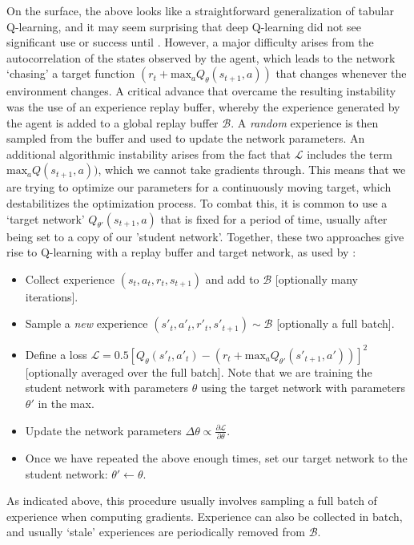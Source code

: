 On the surface, the above looks like a straightforward generalization of tabular Q-learning, and it may seem surprising that deep Q-learning did not see significant use or success until \citet{mnih2013playing}.
However, a major difficulty arises from the autocorrelation of the states observed by the agent, which leads to the network `chasing' a target function $(r_t + \text{max}_a Q_\theta(s_{t+1}, a))$ that changes whenever the environment changes.
A critical advance that overcame the resulting instability was the use of an experience replay buffer, whereby the experience generated by the agent is added to a global replay buffer $\mathcal{B}$.
A \emph{random} experience is then sampled from the buffer and used to update the network parameters.
An additional algorithmic instability arises from the fact that $\mathcal{L}$ includes the term $\text{max}_a Q(s_{t+1}, a))$, which we cannot take gradients through.
This means that we are trying to optimize our parameters for a continuously moving target, which destabilitizes the optimization process.
To combat this, it is common to use a `target network' $Q_{\theta'}(s_{t+1}, a)$ that is fixed for a period of time, usually after being set to a copy of our 'student network'.
Together, these two approaches give rise to Q-learning with a replay buffer and target network, as used by \citet{mnih2013playing}:
\begin{itemize}
    \item Collect experience $(s_t, a_t, r_t, s_{t+1})$ and add to $\mathcal{B}$ [optionally many iterations].
    \item Sample a \emph{new} experience $(s'_t, a'_t, r'_t, s'_{t+1}) \sim \mathcal{B}$ [optionally a full batch].
    \item Define a loss $\mathcal{L} = 0.5 [ Q_\theta(s'_t, a'_t) - (r_t + \text{max}_a Q_{\theta'}(s'_{t+1}, a')) ]^2 $ [optionally averaged over the full batch]. Note that we are training the student network with parameters $\theta$ using the target network with parameters $\theta'$ in the max.
    \item Update the network parameters $\Delta \theta \propto \frac{\partial \mathcal{L}}{\partial \theta}$.
    \item Once we have repeated the above enough times, set our target network to the student network: $\theta' \leftarrow \theta$.
\end{itemize}
As indicated above, this procedure usually involves sampling a full batch of experience when computing gradients.
Experience can also be collected in batch, and usually `stale' experiences are periodically removed from $\mathcal{B}$.
